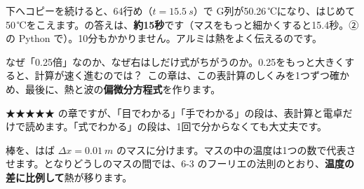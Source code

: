 下へコピーを続けると、64行め（$t=\qty{15.5}{s}$）で G列が50.26\,℃になり、はじめて50\,℃をこえます。\bkhatenaref の答えは、\textbf{約15秒}です（マスをもっと細かくすると15.4秒。②の Python で）。10分もかかりません。アルミは熱をよく伝えるのです。

なぜ「0.25倍」なのか、なぜ右はしだけ式がちがうのか。0.25をもっと大きくすると、計算が速く進むのでは？\ この章は、この表計算のしくみを1つずつ確かめ、最後に、熱と波の\textbf{偏微分方程式}を作ります。

★★★★★ の章ですが、「目でわかる」「手でわかる」の段は、表計算と電卓だけで読めます。「式でわかる」の段は、1回で分からなくても大丈夫です。

\begin{omoidasou}
\end{omoidasou}




\label{bk:8-13:masu}棒を、はば $\Delta x=\qty{0.01}{m}$ のマスに分けます。マスの中の温度は1つの数で代表させます。となりどうしのマスの間では、6-3 のフーリエの法則のとおり、\textbf{温度の差に比例して}熱が移ります。

